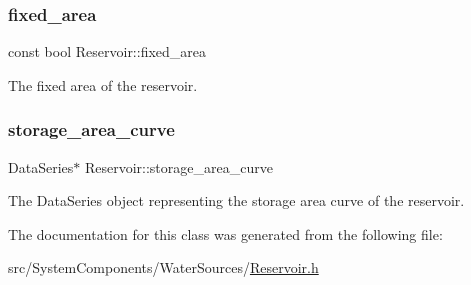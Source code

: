 \subsubsection{\texorpdfstring{fixed\+\_\+area}{fixed\_area}}
{\footnotesize\ttfamily const bool Reservoir\+::fixed\+\_\+area}



The fixed area of the reservoir. 

\mbox{\label{classReservoir_a46bd5b750963dfa9a57b247fd77ab8ff}} 
\subsubsection{\texorpdfstring{storage\+\_\+area\+\_\+curve}{storage\_area\_curve}}
{\footnotesize\ttfamily Data\+Series$\ast$ Reservoir\+::storage\+\_\+area\+\_\+curve\hspace{0.3cm}{\ttfamily [protected]}}



The Data\+Series object representing the storage area curve of the reservoir. 



The documentation for this class was generated from the following file\+:\begin{DoxyCompactItemize}
\item 
src/\+System\+Components/\+Water\+Sources/\mbox{\hyperlink{Reservoir_8h}{Reservoir.\+h}}\end{DoxyCompactItemize}
